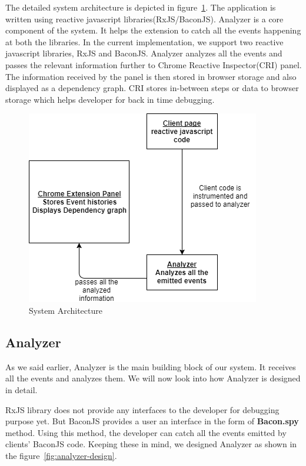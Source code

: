 The detailed system architecture is depicted in figure~\ref{fig:system-architecture}. The application is written using reactive javascript libraries(RxJS/BaconJS). Analyzer is a core component of the system. It helps the extension to catch all the events happening at both the libraries. In the current implementation, we support two reactive javascript libraries, RxJS and BaconJS. Analyzer analyzes all the events and passes the relevant information further to Chrome Reactive Inspector(CRI) panel. The information received by the panel is then stored in browser storage and also displayed as a dependency graph. CRI stores in-between steps or data to browser storage which helps developer for back in time debugging.

\begin{figure}[!h]
	\centering
	\includegraphics[scale=0.6,trim=0 0 0 0]{images/system-architecture.png}
	\caption{System Architecture}
	\label{fig:system-architecture}
\end{figure}

\subsection{Analyzer}
As we said earlier, Analyzer is the main building block of our system. It receives all the events and analyzes them. We will now look into how Analyzer is designed in detail.

RxJS library does not provide any interfaces to the developer for debugging purpose yet. But BaconJS provides a user an interface in the form of \textbf{Bacon.spy} method. Using this method, the developer can catch all the events emitted by clients' BaconJS code. Keeping these in mind, we designed Analyzer as shown in the figure~\ref{fig:analyzer-design}. 

